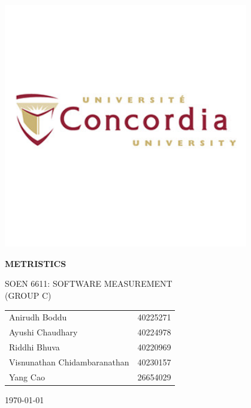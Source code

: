 \documentclass[letterpaper]{report}
\newcommand{\titlestr}{METRISTICS}
\begin{document}
\begin{titlepage}
  \centering
  \includegraphics[width=0.8\textwidth]{image.png}

  \vspace{0.5cm}
  {\LARGE \bf{\titlestr} \par}
  
  \vspace{.5cm}
  {\LARGE {SOEN 6611: SOFTWARE MEASUREMENT \\ (GROUP C)} \par}

  \vspace{0.5cm}

  {\large
  \begin{tabular}{@{} l l @{}}
    Anirudh Boddu &  40225271 \\
    Ayushi Chaudhary &  40224978 \\
    Riddhi Bhuva &  40220969 \\
    Visnunathan Chidambaranathan &  40230157 \\
    Yang Cao &  26654029 \\
  \end{tabular}
  }
  
  \vspace{0.5cm}
  \today
  

  \vfill
\end{titlepage}

\newpage

\thispagestyle{empty}
\tableofcontents
\listoffigures
\listoftables
\clearpage
\end{document}
